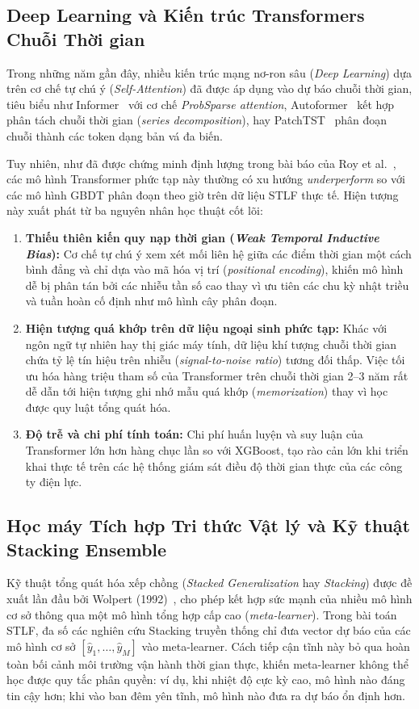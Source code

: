 \subsection{Deep Learning và Kiến trúc Transformers Chuỗi Thời gian}
Trong những năm gần đây, nhiều kiến trúc mạng nơ-ron sâu (\textit{Deep Learning}) dựa trên cơ chế tự chú ý (\textit{Self-Attention}) đã được áp dụng vào dự báo chuỗi thời gian, tiêu biểu như Informer~\cite{zhou2021informer} với cơ chế \textit{ProbSparse attention}, Autoformer~\cite{wu2021autoformer} kết hợp phân tách chuỗi thời gian (\textit{series decomposition}), hay PatchTST~\cite{nie2023time} phân đoạn chuỗi thành các token dạng bản vá đa biến.

Tuy nhiên, như đã được chứng minh định lượng trong bài báo của Roy et al.~\cite{roy2025hourly}, các mô hình Transformer phức tạp này thường có xu hướng \textit{underperform} so với các mô hình GBDT phân đoạn theo giờ trên dữ liệu STLF thực tế. Hiện tượng này xuất phát từ ba nguyên nhân học thuật cốt lõi:
\begin{enumerate}
    \item \textbf{Thiếu thiên kiến quy nạp thời gian (\textit{Weak Temporal Inductive Bias}):} Cơ chế tự chú ý xem xét mối liên hệ giữa các điểm thời gian một cách bình đẳng và chỉ dựa vào mã hóa vị trí (\textit{positional encoding}), khiến mô hình dễ bị phân tán bởi các nhiễu tần số cao thay vì ưu tiên các chu kỳ nhật triều và tuần hoàn cố định như mô hình cây phân đoạn.
    \item \textbf{Hiện tượng quá khớp trên dữ liệu ngoại sinh phức tạp:} Khác với ngôn ngữ tự nhiên hay thị giác máy tính, dữ liệu khí tượng chuỗi thời gian chứa tỷ lệ tín hiệu trên nhiễu (\textit{signal-to-noise ratio}) tương đối thấp. Việc tối ưu hóa hàng triệu tham số của Transformer trên chuỗi thời gian 2--3 năm rất dễ dẫn tới hiện tượng ghi nhớ mẫu quá khớp (\textit{memorization}) thay vì học được quy luật tổng quát hóa.
    \item \textbf{Độ trễ và chi phí tính toán:} Chi phí huấn luyện và suy luận của Transformer lớn hơn hàng chục lần so với XGBoost, tạo rào cản lớn khi triển khai thực tế trên các hệ thống giám sát điều độ thời gian thực của các công ty điện lực.
\end{enumerate}

\subsection{Học máy Tích hợp Tri thức Vật lý và Kỹ thuật Stacking Ensemble}
Kỹ thuật tổng quát hóa xếp chồng (\textit{Stacked Generalization} hay \textit{Stacking}) được đề xuất lần đầu bởi Wolpert (1992)~\cite{wolpert1992stacked}, cho phép kết hợp sức mạnh của nhiều mô hình cơ sở thông qua một mô hình tổng hợp cấp cao (\textit{meta-learner}). Trong bài toán STLF, đa số các nghiên cứu Stacking truyền thống chỉ đưa vector dự báo của các mô hình cơ sở $[\hat{y}_1, \dots, \hat{y}_M]$ vào meta-learner. Cách tiếp cận tĩnh này bỏ qua hoàn toàn bối cảnh môi trường vận hành thời gian thực, khiến meta-learner không thể học được quy tắc phân quyền: ví dụ, khi nhiệt độ cực kỳ cao, mô hình nào đáng tin cậy hơn; khi vào ban đêm yên tĩnh, mô hình nào đưa ra dự báo ổn định hơn.

